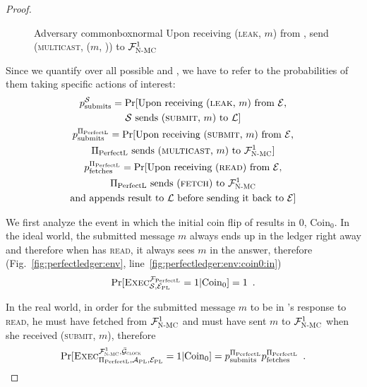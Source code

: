 \begin{proof}
    \begin{figure}[H]
      \begin{titlebox}{Adversary \normalfont \perfectadv}{commonbox}{normal}
        Upon receiving (\textsc{leak}, $m$) from \perfectenv, send
        (\textsc{multicast}, ($m$, \alice)) to $\mathcal{F}_{\textsc{N-MC}}^1$
      \end{titlebox}
      \caption{}
      \label{fig:perfectledger:adv}
    \end{figure}

    Since we quantify over all possible \simulator{} and \perfectprot, we have
    to refer to the probabilities of them taking specific actions of interest:
    \begin{gather*}
      p^{\mathcal{S}}_{\mathrm{submits}} = \Pr[\text{Upon receiving (\textsc{leak}, $m$) from
      \ensuremath{\mathcal{E}},} \\
      \text{\ensuremath{\mathcal{S}}{} sends (\textsc{submit}, $m$) to $\mathcal{L}$}] \\
      p^{\Pi_{\mathrm{PerfectL}}}_{\mathrm{submits}} = \Pr[\text{Upon receiving (\textsc{submit}, $m$) from
      \ensuremath{\mathcal{E}},} \\
      \text{\ensuremath{\Pi_{\mathrm{PerfectL}}}{} sends (\textsc{multicast}, $m$) to $\mathcal{F}_{\textsc{N-MC}}^1$}]
      \\
      p^{\Pi_{\mathrm{PerfectL}}}_{\mathrm{fetches}} = \Pr[\text{Upon receiving (\textsc{read}) from \ensuremath{\mathcal{E}},}
      \\
      \text{\ensuremath{\Pi_{\mathrm{PerfectL}}}{} sends (\textsc{fetch}) to $\mathcal{F}_{\textsc{N-MC}}^1$} \\
      \text{and appends result to $\mathcal{L}$ before sending it back to
      \ensuremath{\mathcal{E}}}]
    \end{gather*}

    We first analyze the event in which the initial coin flip of \environment{}
    results in 0, $\mathrm{Coin}_0$. In the ideal world, the submitted message
    $m$ always ends up in the ledger right away and therefore when
    \environment{} has \bob{} \textsc{read}, it always sees $m$ in the answer,
    therefore (Fig.~\ref{fig:perfectledger:env},
    line~\ref{fig:perfectledger:env:coin0:in})
    \begin{equation}
    \label{eq:coin0:ideal}
      \Pr[\textsc{Exec}^{\perfectledger}_{\simulator, \perfectenv} = 1 |
      \mathrm{Coin}_0] = 1 \enspace.
    \end{equation}

    In the real world, in order for the submitted message $m$ to be in \bob's
    response to \textsc{read}, he must have fetched from $\mathcal{F}_{\textsc{N-MC}}^1$ and
    \alice{} must have sent $m$ to $\mathcal{F}_{\textsc{N-MC}}^1$ when she received
    (\textsc{submit}, $m$), therefore
    \begin{equation}
    \label{eq:coin0:real}
      \Pr[\textsc{Exec}^{\FnetworkEd^1, \gFclock}_{\perfectprot, \perfectadv,
      \perfectenv} = 1 | \mathrm{Coin}_0] = \ppsubmits \ppfetches \enspace.
    \end{equation}


\end{proof}
